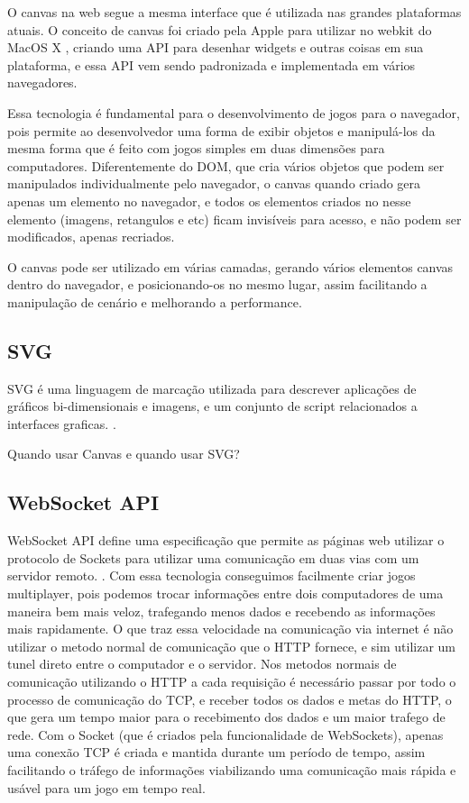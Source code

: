 O canvas na web segue a mesma interface que é utilizada nas grandes
plataformas atuais. O conceito de canvas foi criado pela Apple para
utilizar no webkit do MacOS X \cite{lubbers2010pro}, criando uma API
para desenhar widgets e outras coisas em sua plataforma, e essa API
vem sendo padronizada e implementada em vários navegadores.

Essa tecnologia é fundamental para o desenvolvimento de jogos para
o navegador, pois permite ao desenvolvedor uma forma de exibir
objetos e manipulá-los da mesma forma que é feito com jogos
simples em duas dimensões para computadores.
Diferentemente do DOM, que cria vários objetos que podem ser
manipulados individualmente pelo navegador, o canvas quando criado
gera apenas um elemento no navegador, e todos os elementos criados
no nesse elemento (imagens, retangulos e etc) ficam invisíveis para acesso, e
não podem ser modificados, apenas recriados.

O canvas pode ser utilizado em várias camadas, gerando vários
elementos canvas dentro do navegador, e posicionando-os no mesmo
lugar, assim facilitando a manipulação de cenário e melhorando a
performance.


\subsection{SVG}
SVG é uma linguagem de marcação utilizada para descrever aplicações de gráficos
bi-dimensionais e imagens, e um conjunto de script relacionados a
interfaces graficas. \cite{w3csvg}.

Quando usar Canvas e quando usar SVG?

\subsection{WebSocket API}

WebSocket API define uma especificação que permite as páginas web
utilizar o protocolo de Sockets para utilizar uma comunicação em duas
vias com um servidor remoto. \cite{w3cwebsockets}. Com essa tecnologia
conseguimos facilmente criar jogos multiplayer, pois podemos
trocar informações entre dois computadores de uma maneira bem mais
veloz, trafegando menos dados e recebendo as informações mais
rapidamente.
O que traz essa velocidade na comunicação via internet é não utilizar
o metodo normal de comunicação que o HTTP fornece, e sim utilizar um
tunel direto entre o computador e o servidor.
Nos metodos normais de comunicação utilizando o HTTP a cada requisição
é necessário passar por todo o processo de comunicação do TCP, e
receber todos os dados e metas do HTTP, o que gera um tempo maior para
o recebimento dos dados e um maior trafego de rede. Com o Socket (que
é criados pela funcionalidade de WebSockets), apenas uma conexão TCP é
criada e mantida durante um período de tempo, assim facilitando o
tráfego de informações viabilizando uma comunicação mais rápida e
usável para um jogo em tempo real.

